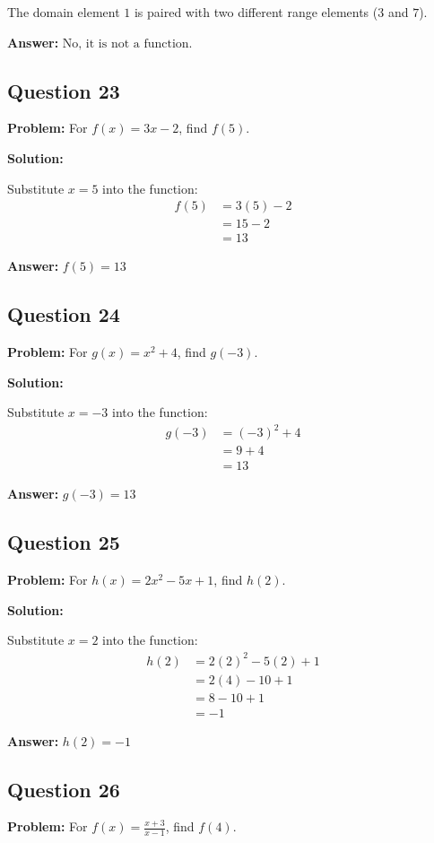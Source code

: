 \documentclass[12pt]{article}
\begin{document}
The domain element $1$ is paired with two different range elements ($3$ and $7$).

\textbf{Answer:} $\boxed{\text{No, it is not a function.}}$

\subsection*{Question 23}
\textbf{Problem:} For $f(x) = 3x - 2$, find $f(5)$.

\textbf{Solution:}

Substitute $x = 5$ into the function:
\begin{align*}
f(5) &= 3(5) - 2 \\
&= 15 - 2 \\
&= 13
\end{align*}

\textbf{Answer:} $\boxed{f(5) = 13}$

\subsection*{Question 24}
\textbf{Problem:} For $g(x) = x^2 + 4$, find $g(-3)$.

\textbf{Solution:}

Substitute $x = -3$ into the function:
\begin{align*}
g(-3) &= (-3)^2 + 4 \\
&= 9 + 4 \\
&= 13
\end{align*}

\textbf{Answer:} $\boxed{g(-3) = 13}$

\subsection*{Question 25}
\textbf{Problem:} For $h(x) = 2x^2 - 5x + 1$, find $h(2)$.

\textbf{Solution:}

Substitute $x = 2$ into the function:
\begin{align*}
h(2) &= 2(2)^2 - 5(2) + 1 \\
&= 2(4) - 10 + 1 \\
&= 8 - 10 + 1 \\
&= -1
\end{align*}

\textbf{Answer:} $\boxed{h(2) = -1}$

\subsection*{Question 26}
\textbf{Problem:} For $f(x) = \frac{x+3}{x-1}$, find $f(4)$.
\end{document}
